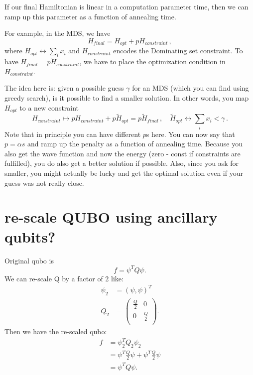 \documentclass[]{article}
\begin{document}
If our final Hamiltonian is linear in a computation parameter time, then we can ramp up this parameter as a function of annealing time.

For example, in the MDS, we have
\begin{equation}
	H_{final} = H_{opt} + p H_{constraint} \, ,
\end{equation}
where $H_{opt} \leftrightarrow \sum_i x_i$ and $H_{constraint}$ encodes the Dominating set constraint.
To have $H_{final} = p \tilde{H}_{constraint}$, we have to place the optimization condition in $H_{constraint}$.

The idea here is: given a possible guess $\gamma$ for an MDS (which you can find using greedy search), is it possible to find a smaller solution.
In other words, you map $H_{opt}$ to a new constraint
\begin{equation}
	 H_{constraint} \mapsto  p  H_{constraint} + p  \tilde H_{opt} = p \tilde H_{final} 
	\, , \quad
	\tilde H_{opt} \leftrightarrow \sum_i x_i < \gamma \, .
\end{equation}
Note that in principle you can have different $p$s here.
You can now say that $p = \alpha s$ and ramp up the penalty as a function of annealing time.
Because you also get the wave function and now the energy (zero - const if constraints are fulfilled), you do also get a better solution if possible.
Also, since you ask for smaller, you might actually be lucky and get the optimal solution even if your guess was not really close.


\section{re-scale QUBO using ancillary qubits?}

Original qubo is
\begin{equation}
f= \psi^T Q \psi .
\end{equation}
We can re-scale Q by a factor of 2 like:
 \begin{align}
\psi_2 &= (\psi , \psi)^T \\
Q_2 &= 
\begin{pmatrix}
\frac{Q}{2} & 0 \\
0 & \frac{Q}{2} \\
\end{pmatrix} .
\end{align}
Then we have the re-scaled qubo:
\begin{align}
f &= \psi_2^T Q_2 \psi_2 \\
&=  \psi^T  \frac{Q}{2} \psi +  \psi^T  \frac{Q}{2} \psi \\
&=  \psi^T Q \psi .
\end{align}
\end{document}
